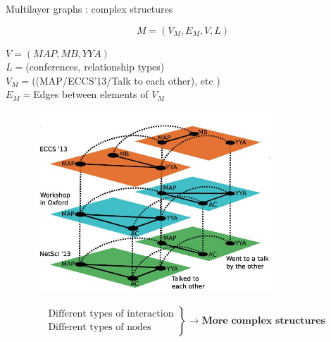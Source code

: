 \documentclass[15pt]{beamer}
\begin{document}
\begin{frame}{Multilayer graphs : complex structures}

\[
	M=(V_M,E_M,V,L)
\]
\begin{minipage}{0.4\textwidth}
\begin{footnotesize}
$V = (MAP,MB,YYA)$\\
$L = $(conferences, relationship types)\\
$V_M = $((MAP/ECCS'13/Talk to each other), etc )\\
$E_M = $Edges between elements of $V_M$
\end{footnotesize}
\end{minipage}
\begin{minipage}[r]{0.59\textwidth}
\begin{figure}
    \flushright
    \includegraphics[width=0.8\textwidth]{img/exMulti.jpg}
    \label{fig:exmultitransport}
\end{figure}
\end{minipage}
$$
\left.
\begin{array}{l}
    \text{ Different types of interaction}\\
    \text{ Different types of nodes}
\end{array}
\right \}\rightarrow \textbf{More complex structures}
$$

\end{frame}
\end{document}
